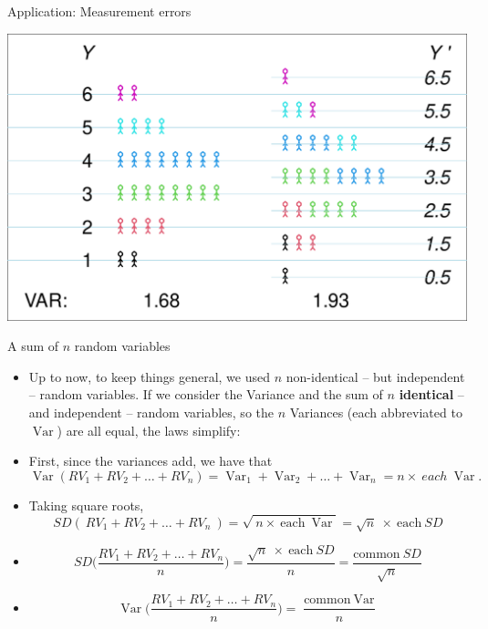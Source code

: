 \documentclass[10pt]{beamer}\usepackage[]{graphicx}\usepackage[]{color}
\makeatletter
\def\maxwidth{ %
  \ifdim\Gin@nat@width>\linewidth
    \linewidth
  \else
    \Gin@nat@width
  \fi
}
\newenvironment{knitrout}{}{} %
\newcommand{\Var}{\operatorname{Var}}
\makeatother
\begin{document}
\begin{frame}[fragile]{Application: Measurement errors}
	
\begin{knitrout}\tiny
{}\color{fgcolor}

{\centering \includegraphics[width=\maxwidth]{figure/unnamed-chunk-11-1} 

}


\end{knitrout}
	
\end{frame}


\begin{frame}[fragile]{A sum of $n$ random variables}
	
	\begin{itemize}
		\setlength{\itemsep}{10pt}		
	\item Up to now, to keep things general, we used $n$ non-identical -- but independent -- random variables. If we
	consider the Variance and the sum of $n$ \textbf{identical} -- and independent -- random variables, so the $n$ Variances (each abbreviated to $\Var$) are all equal, the laws simplify:
	
	\item First, since the variances add, we have that	
	$$ \Var(RV_1 + RV_2 + \dots + RV_n) = \Var_1 + \Var_2 + \dots + \Var_n = n \times \ each \ \Var.$$
	
\item Taking square roots,	
	$$ SD( \ RV_1 + RV_2 + \dots + RV_n \ ) = \sqrt{ \ n \times \ \textrm{each} \ \Var} = \sqrt{n} \ \times \ \textrm{each} \ SD$$
	
	\pause

	\item $$ SD\bigg(\frac{RV_1 + RV_2 + \dots + RV_n}{n}\bigg) = \frac{\sqrt{n} \ \times \ \textrm{each} \ SD}{n} = \frac{\textrm{common} \ SD}{\sqrt{n}} $$
	
	\item $$ \Var\bigg(\frac{RV_1 + RV_2 + \dots + RV_n}{n}\bigg) = \frac{\textrm{common} \ \Var}{n} $$
	

		 
\end{itemize}

\end{frame}
\end{document}
